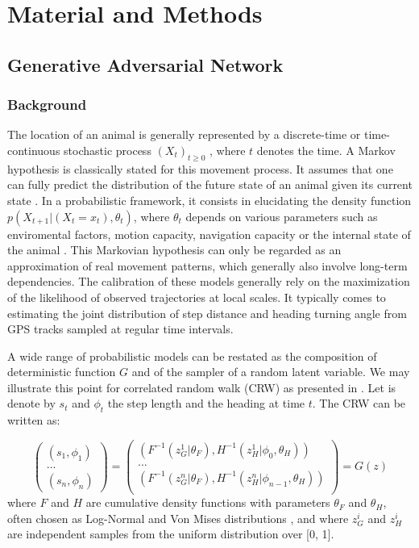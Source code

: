 \documentclass{article}
\begin{document}
\section{Material and Methods}

\subsection{Generative Adversarial Network}

\subsubsection{Background}
The location of an animal is generally represented by a discrete-time or time-continuous stochastic process $(X_t)_{t \geq 0 }$ , where $t$ denotes the time. A Markov hypothesis is classically stated for this movement process. 
It assumes that one can fully predict the distribution of the future state of an animal given its current state \citep{patterson_statespace_2008}. In a probabilistic framework, it consists in elucidating the density function $p(X_{t+1} | (X_t = x_t), \theta_t)$, where $\theta_t$ depends on various parameters such as enviromental factors, motion capacity, navigation capacity or the internal state of the animal \citep{nathan_movement_2008}. This Markovian hypothesis can only be regarded as an approximation of real movement patterns, which generally also involve long-term dependencies. The calibration of these models generally rely on the maximization of the likelihood of observed trajectories at local scales. It typically comes to estimating the joint distribution of step distance and heading turning angle from GPS tracks sampled at regular time intervals. 

A wide range of probabilistic models can be restated as the composition of deterministic function $G$ and of the sampler of a random latent variable. We may illustrate this point for correlated random walk (CRW) as presented in \cite{patterson_statespace_2008}. Let is denote by $s_t$ and $\phi_t$ the step length and the heading at time $t$. The CRW can be written as:

\begin{equation}
    \begin{pmatrix}
    (s_1 , \phi_1) \\
    ... \\
    (s_n , \phi_n)
    \end{pmatrix}
    = 
    \begin{pmatrix}
    ( F^{-1}(z^1_G | \theta_F) ,  H^{-1}(z^1_H | \phi_0, \theta_H) )\\
    ... \\
    ( F^{-1}(z^n_G | \theta_F) ,  H^{-1}(z^n_H | \phi_{n-1}, \theta_H) )\\
    \end{pmatrix}
    = 
    G(z)
\end{equation}
where $F$ and $H$ are cumulative density functions with parameters $\theta_F$ and $\theta_H$, often chosen as Log-Normal and Von Mises distributions , and where $z_G^i$ and $z_H^i$ are independent samples from the uniform distribution over [0, 1]. 
\end{document}
